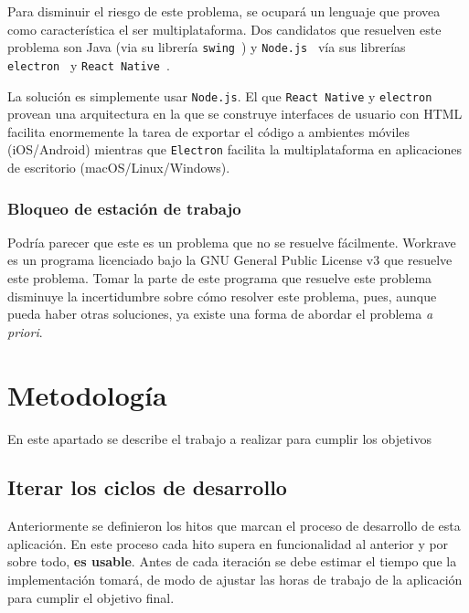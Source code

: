 \documentclass[12pt,letterpaper]{report}
\begin{document}
Para disminuir el riesgo de este problema, se ocupará un lenguaje que
provea como característica el ser multiplataforma.  Dos candidatos que
resuelven este problema son Java (via su librería
\texttt{swing}~\cite{javaswing}) y \texttt{Node.js}~\cite{nodejs} vía
sus librerías \texttt{electron}~\cite{electron} y \texttt{React\
Native}~\cite{react-native}.

La solución es simplemente usar \texttt{Node.js}. El que \texttt{React
Native} y \texttt{electron} provean una arquitectura en la que se
construye interfaces de usuario con HTML facilita enormemente la tarea
de exportar el código a ambientes móviles (iOS/Android) mientras que
\texttt{Electron} facilita la multiplataforma en aplicaciones de
escritorio (macOS/Linux/Windows).

\subsubsection{Bloqueo de estación de trabajo}\label{bloqueo-de-estacion-de-trabajo}

Podría parecer que este es un problema que no se resuelve
fácilmente. Workrave~\cite{workrave} es un programa licenciado bajo la
GNU General Public License v3 que resuelve este problema. Tomar la
parte de este programa que resuelve este problema disminuye la
incertidumbre sobre cómo resolver este problema, pues, aunque pueda
haber otras soluciones, ya existe una forma de abordar el problema
\emph{a priori}.

\newpage
\section{Metodología}\label{metodologuxeda}

En este apartado se describe el trabajo a realizar para cumplir los
objetivos

\subsection{Iterar los ciclos de desarrollo}\label{iterar-los-ciclos-de-desarrollo}

Anteriormente se definieron los hitos que marcan el proceso de
desarrollo de esta aplicación. En este proceso cada hito supera en
funcionalidad al anterior y por sobre todo, \textbf{es usable}. Antes
de cada iteración se debe estimar el tiempo que la implementación
tomará, de modo de ajustar las horas de trabajo de la aplicación para
cumplir el objetivo final.
\end{document}
